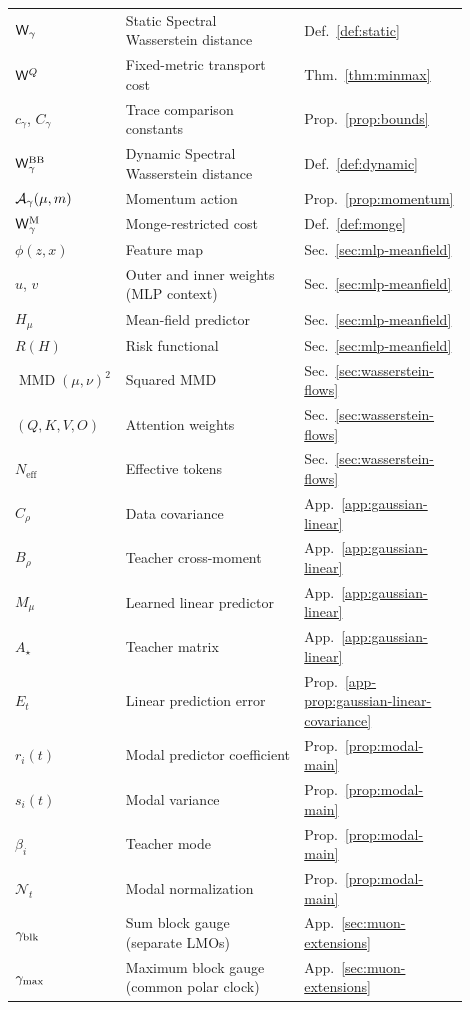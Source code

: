\begin{longtable}{@{}p{0.23\linewidth}p{0.39\linewidth}p{0.28\linewidth}@{}}
$\mathsf{W}_{\gamma}$ & Static Spectral Wasserstein distance & Def.~\ref{def:static} \\
$\mathsf{W}^{Q}$ & Fixed-metric transport cost & Thm.~\ref{thm:minmax} \\
$c_\gamma$, $C_\gamma$ & Trace comparison constants & Prop.~\ref{prop:bounds} \\
$\mathsf{W}_{\gamma}^{\mathrm{BB}}$ & Dynamic Spectral Wasserstein distance & Def.~\ref{def:dynamic} \\
$\mathcal A_\gamma(\mu,m)$ & Momentum action & Prop.~\ref{prop:momentum} \\
$\mathsf{W}_{\gamma}^{\mathrm{M}}$ & Monge-restricted cost & Def.~\ref{def:monge} \\
$\phi(z,x)$ & Feature map & Sec.~\ref{sec:mlp-meanfield} \\
$u$, $v$ & Outer and inner weights (MLP context) & Sec.~\ref{sec:mlp-meanfield} \\
$H_\mu$ & Mean-field predictor & Sec.~\ref{sec:mlp-meanfield} \\
$R(H)$ & Risk functional & Sec.~\ref{sec:mlp-meanfield} \\
$\operatorname{MMD}(\mu,\nu)^2$ & Squared MMD & Sec.~\ref{sec:wasserstein-flows} \\
$(Q,K,V,O)$ & Attention weights & Sec.~\ref{sec:wasserstein-flows} \\
$N_{\mathrm{eff}}$ & Effective tokens & Sec.~\ref{sec:wasserstein-flows} \\
$C_\rho$ & Data covariance & App.~\ref{app:gaussian-linear} \\
$B_\rho$ & Teacher cross-moment & App.~\ref{app:gaussian-linear} \\
$M_\mu$ & Learned linear predictor & App.~\ref{app:gaussian-linear} \\
$A_\star$ & Teacher matrix & App.~\ref{app:gaussian-linear} \\
$E_t$ & Linear prediction error & Prop.~\ref{app-prop:gaussian-linear-covariance} \\
$r_i(t)$ & Modal predictor coefficient & Prop.~\ref{prop:modal-main} \\
$s_i(t)$ & Modal variance & Prop.~\ref{prop:modal-main} \\
$\beta_i$ & Teacher mode & Prop.~\ref{prop:modal-main} \\
$\mathcal N_t$ & Modal normalization & Prop.~\ref{prop:modal-main} \\
$\gamma_{\rm blk}$ & Sum block gauge (separate LMOs) & App.~\ref{sec:muon-extensions} \\
$\gamma_{\rm max}$ & Maximum block gauge (common polar clock) & App.~\ref{sec:muon-extensions} \\

\end{longtable}

